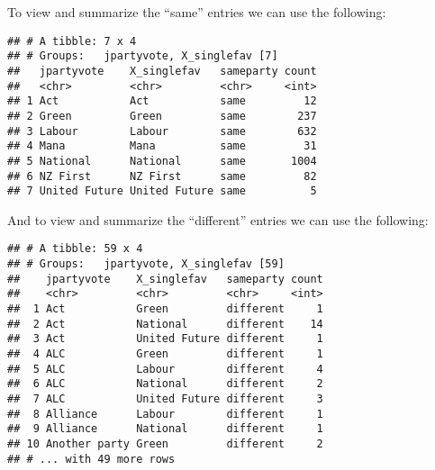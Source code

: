 \documentclass[]{article}
\newenvironment{Shaded}{\begin{snugshade}}{\end{snugshade}}
\newcommand{\KeywordTok}[1]{\textcolor[rgb]{0.13,0.29,0.53}{\textbf{#1}}}
\newcommand{\DataTypeTok}[1]{\textcolor[rgb]{0.13,0.29,0.53}{#1}}
\newcommand{\StringTok}[1]{\textcolor[rgb]{0.31,0.60,0.02}{#1}}
\newcommand{\OperatorTok}[1]{\textcolor[rgb]{0.81,0.36,0.00}{\textbf{#1}}}
\newcommand{\NormalTok}[1]{#1}
\begin{document}
To view and summarize the ``same'' entries we can use the following:

\begin{Shaded}
\end{Shaded}

\begin{verbatim}
## # A tibble: 7 x 4
## # Groups:   jpartyvote, X_singlefav [7]
##   jpartyvote    X_singlefav   sameparty count
##   <chr>         <chr>         <chr>     <int>
## 1 Act           Act           same         12
## 2 Green         Green         same        237
## 3 Labour        Labour        same        632
## 4 Mana          Mana          same         31
## 5 National      National      same       1004
## 6 NZ First      NZ First      same         82
## 7 United Future United Future same          5
\end{verbatim}

And to view and summarize the ``different'' entries we can use the
following:

\begin{Shaded}
\end{Shaded}

\begin{verbatim}
## # A tibble: 59 x 4
## # Groups:   jpartyvote, X_singlefav [59]
##    jpartyvote    X_singlefav   sameparty count
##    <chr>         <chr>         <chr>     <int>
##  1 Act           Green         different     1
##  2 Act           National      different    14
##  3 Act           United Future different     1
##  4 ALC           Green         different     1
##  5 ALC           Labour        different     4
##  6 ALC           National      different     2
##  7 ALC           United Future different     3
##  8 Alliance      Labour        different     1
##  9 Alliance      National      different     1
## 10 Another party Green         different     2
## # ... with 49 more rows
\end{verbatim}
\end{document}
